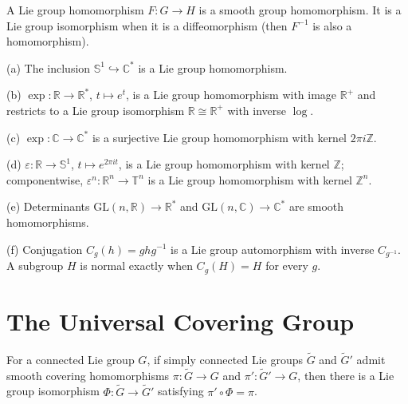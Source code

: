 \begin{definition}
\label{def:7-47-extra-1}




A Lie group homomorphism $F:G\to H$ is a smooth group homomorphism. It is a Lie group isomorphism when it is a diffeomorphism (then $F^{-1}$ is also a homomorphism).
\end{definition}

\begin{example}
\label{ex:7-4}



(a) The inclusion $\mathbb S^1\hookrightarrow\mathbb C^*$ is a Lie group homomorphism.

(b) $\exp:\mathbb R\to\mathbb R^*$, $t\mapsto e^t$, is a Lie group
homomorphism with image $\mathbb R^+$ and restricts to a Lie group isomorphism
$\mathbb R\cong\mathbb R^+$ with inverse $\log$.

(c) $\exp:\mathbb C\to\mathbb C^*$ is a surjective Lie group homomorphism with
kernel $2\pi i\mathbb Z$.

(d) $\varepsilon:\mathbb R\to\mathbb S^1$, $t\mapsto e^{2\pi it}$, is a Lie
group homomorphism with kernel $\mathbb Z$; componentwise,
$\varepsilon^n:\mathbb R^n\to\mathbb T^n$ is a Lie group homomorphism with
kernel $\mathbb Z^n$.

(e) Determinants $\mathrm{GL}(n,\mathbb R)\to\mathbb R^*$ and $\mathrm{GL}(n,\mathbb C)\to\mathbb C^*$ are smooth homomorphisms.

(f) Conjugation $C_g(h)=ghg^{-1}$ is a Lie group automorphism with inverse $C_{g^{-1}}$. A subgroup $H$ is normal exactly when $C_g(H)=H$ for every $g$.
\end{example}

\section{The Universal Covering Group}


\begin{theorem}
\label{thm:7-9}




For a connected Lie group $G$, if simply connected Lie groups $\widetilde G$ and $\widetilde G'$ admit smooth covering homomorphisms $\pi:\widetilde G\to G$ and $\pi':\widetilde G'\to G$, then there is a Lie group isomorphism $\Phi:\widetilde G\to\widetilde G'$ satisfying $\pi'\circ\Phi=\pi$.
\end{theorem}

